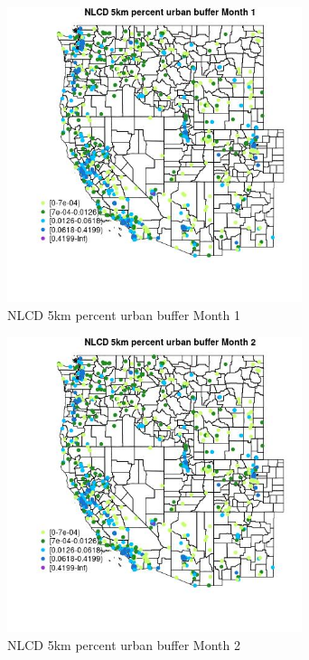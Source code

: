 \begin{figure} 
\centering  
\includegraphics[width=0.77\textwidth]{Code_Outputs/Report_ML_input_PM25_Step4_part_e_de_duplicated_aves_compiled_2019-05-21wNAs_MapObsMo1NLCD_5km_percent_urban_buffer.jpg} 
\caption{\label{fig:Report_ML_input_PM25_Step4_part_e_de_duplicated_aves_compiled_2019-05-21wNAsMapObsMo1NLCD_5km_percent_urban_buffer}NLCD 5km percent urban buffer Month 1} 
\end{figure} 
 

\begin{figure} 
\centering  
\includegraphics[width=0.77\textwidth]{Code_Outputs/Report_ML_input_PM25_Step4_part_e_de_duplicated_aves_compiled_2019-05-21wNAs_MapObsMo2NLCD_5km_percent_urban_buffer.jpg} 
\caption{\label{fig:Report_ML_input_PM25_Step4_part_e_de_duplicated_aves_compiled_2019-05-21wNAsMapObsMo2NLCD_5km_percent_urban_buffer}NLCD 5km percent urban buffer Month 2} 
\end{figure} 
 

